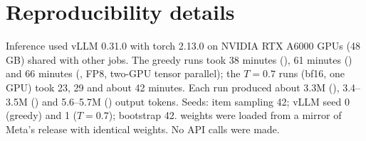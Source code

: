 \section{Reproducibility details}
\label{app:repro}

Inference used vLLM 0.31.0 with torch 2.13.0 on NVIDIA RTX A6000 GPUs (48\,GB) shared with other jobs. The greedy runs took 38 minutes (\qwentwo), 61 minutes (\llama) and 66 minutes (\qwenthree, FP8, two-GPU tensor parallel); the $T{=}0.7$ runs (bf16, one GPU) took 23, 29 and about 42 minutes. Each run produced about 3.3M (\qwentwo), 3.4--3.5M (\llama) and 5.6--5.7M (\qwenthree) output tokens. Seeds: item sampling 42; vLLM seed 0 (greedy) and 1 ($T{=}0.7$); bootstrap 42. \llama weights were loaded from a mirror of Meta's release with identical weights. No API calls were made.

